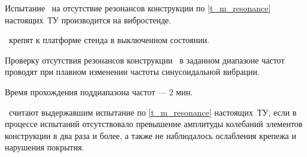Испытание \dut \  на отсутствие резонансов конструкции по \ref{t_m_resonance} настоящих~ТУ производится на вибростенде.

\dut \ крепят к платформе стенда в выключенном состоянии.

Проверку отсутствия резонансов конструкции \dut \ в заданном диапазоне частот проводят при плавном изменении частоты синусоидальной вибрации.

Время прохождения поддиапазона частот --- 2 мин.  

\dut \ считают выдержавшим испытание по \ref{t_m_resonance} настоящих~ТУ, если в процессе испытаний отсутствовало превышение амплитуды колебаний элементов конструкции в два раза и более, а также не наблюдалось ослабления крепежа и нарушения покрытия.